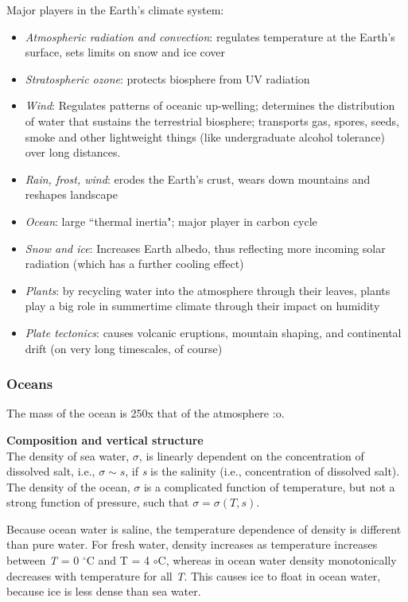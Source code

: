 \documentclass[11pt]{article}
\numberwithin{equation}{section}
\begin{document}
Major players in the Earth's climate system: 
\begin{itemize}
\item \textit{Atmospheric radiation and convection}: regulates temperature at the Earth's surface, sets limits on snow and ice cover 
\item \textit{Stratospheric ozone}: protects biosphere from UV radiation
\item \textit{Wind}: Regulates patterns of oceanic up-welling; determines the distribution of water that sustains the terrestrial biosphere; transports gas, spores, seeds, smoke and other lightweight things (like undergraduate alcohol tolerance) over long distances.
\item \textit{Rain, frost, wind}: erodes the Earth's crust, wears down mountains and reshapes landscape 
\item \textit{Ocean}: large ``thermal inertia"; major player in carbon cycle
\item \textit{Snow and ice}: Increases Earth albedo, thus reflecting more incoming solar radiation (which has a further cooling effect) 
\item \textit{Plants}: by recycling water into the atmosphere through their leaves, plants play a big role in summertime climate through their impact on humidity
\item \textit{Plate tectonics}: causes volcanic eruptions, mountain shaping, and continental drift (on very long timescales, of course)
\end{itemize}

\subsubsection{Oceans}

The mass of the ocean is 250x that of the atmosphere :o.

\textbf{Composition and vertical structure}\\
The density of sea water, $\sigma$, is linearly dependent on the concentration of dissolved salt, i.e., $\sigma \sim s$, if \textit{s} is the salinity (i.e., concentration of dissolved salt). The density of the ocean, $\sigma$ is a complicated function of temperature, but not a strong function of pressure, such that $\sigma = \sigma(T,s)$. 

Because ocean water is saline, the temperature dependence of density is different than pure water. For fresh water, density increases as temperature increases between \textit{T} = 0 $^\circ$C and T = 4 $\circ$C, whereas in ocean water density monotonically decreases with temperature for all \textit{T}. This causes ice to float in ocean water, because ice is less dense than sea water.
\end{document}
